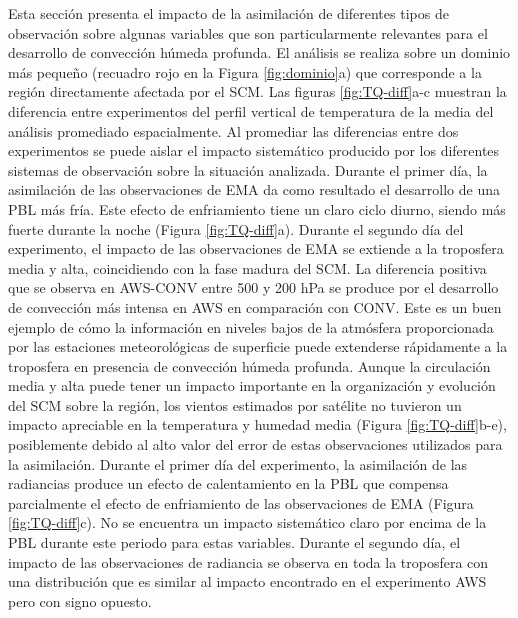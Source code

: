 \documentclass[12pt,oneside,a4paper]{reedthesis}
\begin{document}
Esta sección presenta el impacto de la asimilación de diferentes tipos de observación sobre algunas variables que son particularmente relevantes para el desarrollo de convección húmeda profunda. El análisis se realiza sobre un dominio más pequeño (recuadro rojo en la Figura \ref{fig:dominio}a) que corresponde a la región directamente afectada por el SCM. Las figuras \ref{fig:TQ-diff}a-c muestran la diferencia entre experimentos del perfil vertical de temperatura de la media del análisis promediado espacialmente. Al promediar las diferencias entre dos experimentos se puede aislar el impacto sistemático producido por los diferentes sistemas de observación sobre la situación analizada. Durante el primer día, la asimilación de las observaciones de EMA da como resultado el desarrollo de una PBL más fría. Este efecto de enfriamiento tiene un claro ciclo diurno, siendo más fuerte durante la noche (Figura \ref{fig:TQ-diff}a). Durante el segundo día del experimento, el impacto de las observaciones de EMA se extiende a la troposfera media y alta, coincidiendo con la fase madura del SCM. La diferencia positiva que se observa en AWS-CONV entre 500 y 200 hPa se produce por el desarrollo de convección más intensa en AWS en comparación con CONV. Este es un buen ejemplo de cómo la información en niveles bajos de la atmósfera proporcionada por las estaciones meteorológicas de superficie puede extenderse rápidamente a la troposfera en presencia de convección húmeda profunda. Aunque la circulación media y alta puede tener un impacto importante en la organización y evolución del SCM sobre la región, los vientos estimados por satélite no tuvieron un impacto apreciable en la temperatura y humedad media (Figura \ref{fig:TQ-diff}b-e), posiblemente debido al alto valor del error de estas observaciones utilizados para la asimilación.
Durante el primer día del experimento, la asimilación de las radiancias produce un efecto de calentamiento en la PBL que compensa parcialmente el efecto de enfriamiento de las observaciones de EMA (Figura \ref{fig:TQ-diff}c). No se encuentra un impacto sistemático claro por encima de la PBL durante este periodo para estas variables. Durante el segundo día, el impacto de las observaciones de radiancia se observa en toda la troposfera con una distribución que es similar al impacto encontrado en el experimento AWS pero con signo opuesto.
\end{document}
